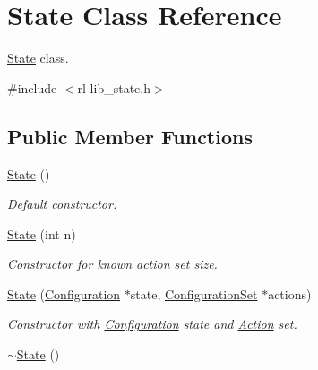 \hypertarget{classState}{\section{State Class Reference}
\label{classState}
}


\hyperlink{classState}{State} class.  




{\ttfamily \#include $<$rl-\/lib\-\_\-state.\-h$>$}

\subsection*{Public Member Functions}
\begin{DoxyCompactItemize}
\item 
\hyperlink{classState_ab91bb1dd5aa6260ab2a456581daf9ec2}{State} ()
\begin{DoxyCompactList}\small\item\em Default constructor. \end{DoxyCompactList}\item 
\hyperlink{classState_acb29b7e6acb6ddac3bfe0629ef0e65b9}{State} (int n)
\begin{DoxyCompactList}\small\item\em Constructor for known action set size. \end{DoxyCompactList}\item 
\hyperlink{classState_a568030b37bd9340c190e2ca295f261d2}{State} (\hyperlink{classConfiguration}{Configuration} $\ast$state, \hyperlink{classConfigurationSet}{Configuration\-Set} $\ast$actions)
\begin{DoxyCompactList}\small\item\em Constructor with \hyperlink{classConfiguration}{Configuration} state and \hyperlink{classAction}{Action} set. \end{DoxyCompactList}\item 
\hypertarget{classState_afab438d92b90dc18d194dbd9c9c8bab3}{\hyperlink{classState_afab438d92b90dc18d194dbd9c9c8bab3}{$\sim$\-State} ()}\label{classState_afab438d92b90dc18d194dbd9c9c8bab3}


\end{DoxyCompactItemize}
